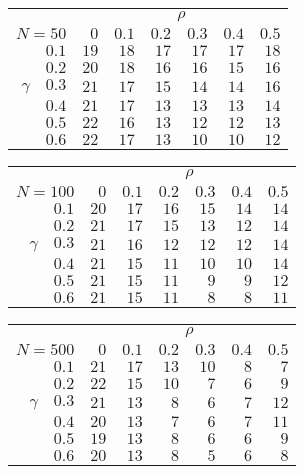 \begin{tabular}{r|rrrrrr}
\hline\hline
 &\multicolumn{6}{c}{$\rho$} \\ 
 $N = 50$ & $0$ & $0.1$ & $0.2$ & $0.3$ & $0.4$ & $0.5$ \\ 
 \hline$0.1$ & $19$ & $18$ & $17$ & $17$ & $17$ & $18$\\ 
$0.2$ & $20$ & $18$ & $16$ & $16$ & $15$ & $16$\\ 
$\gamma\quad$$0.3$ & $21$ & $17$ & $15$ & $14$ & $14$ & $16$\\ 
$0.4$ & $21$ & $17$ & $13$ & $13$ & $13$ & $14$\\ 
$0.5$ & $22$ & $16$ & $13$ & $12$ & $12$ & $13$\\ 
$0.6$ & $22$ & $17$ & $13$ & $10$ & $10$ & $12$\\ 
 \hline 
 \end{tabular}
 
 \vspace{2em} 
 
\begin{tabular}{r|rrrrrr}
\hline\hline
 &\multicolumn{6}{c}{$\rho$} \\ 
 $N = 100$ & $0$ & $0.1$ & $0.2$ & $0.3$ & $0.4$ & $0.5$ \\ 
 \hline$0.1$ & $20$ & $17$ & $16$ & $15$ & $14$ & $14$\\ 
$0.2$ & $21$ & $17$ & $15$ & $13$ & $12$ & $14$\\ 
$\gamma\quad$$0.3$ & $21$ & $16$ & $12$ & $12$ & $12$ & $14$\\ 
$0.4$ & $21$ & $15$ & $11$ & $10$ & $10$ & $14$\\ 
$0.5$ & $21$ & $15$ & $11$ & $9$ & $9$ & $12$\\ 
$0.6$ & $21$ & $15$ & $11$ & $8$ & $8$ & $11$\\ 
 \hline 
 \end{tabular}
 
 \vspace{2em} 
 
\begin{tabular}{r|rrrrrr}
\hline\hline
 &\multicolumn{6}{c}{$\rho$} \\ 
 $N = 500$ & $0$ & $0.1$ & $0.2$ & $0.3$ & $0.4$ & $0.5$ \\ 
 \hline$0.1$ & $21$ & $17$ & $13$ & $10$ & $8$ & $7$\\ 
$0.2$ & $22$ & $15$ & $10$ & $7$ & $6$ & $9$\\ 
$\gamma\quad$$0.3$ & $21$ & $13$ & $8$ & $6$ & $7$ & $12$\\ 
$0.4$ & $20$ & $13$ & $7$ & $6$ & $7$ & $11$\\ 
$0.5$ & $19$ & $13$ & $8$ & $6$ & $6$ & $9$\\ 
$0.6$ & $20$ & $13$ & $8$ & $5$ & $6$ & $8$\\ 
 \hline 
 \end{tabular}